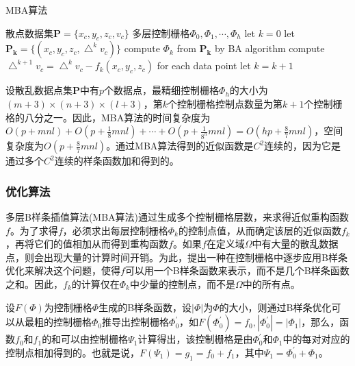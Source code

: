 \begin{algorithm}
    \caption{MBA算法}
    \begin{algorithmic}[1] %
        \Require 散点数据集$ \mathbf{P} = \{ x_{c}, y_{c}, z_{c}, v_{c} \} $
        \Ensure 多层控制栅格$ \Phi_{0},\Phi_{1},\cdots,\Phi_{h} $
        \State let $ k = 0 $
        \State let $ \mathbf{P_{k}} = \{ \left( x_{c}, y_{c}, z_{c}, \bigtriangleup^{k}v_{c} \right) \} $
        \State compute $ \Phi_{k} $ from $ \mathbf{P_{k}} $ by BA algorithm
        \State compute $ \bigtriangleup^{k+1}v_{c} = \bigtriangleup^{k}v_{c} - f_{k}\left( x_{c}, y_{c}, z_{c} \right) $ for each data point
        \State let $ k = k+1 $
        \EndWhile
    \end{algorithmic}
\end{algorithm}

设散乱数据点集$ \mathbf{P} $中有$ p $个数据点，最精细控制栅格$ \Phi_{h} $的大小为$ \left( m+3 \right) \times \left( n+3 \right) \times \left( l+3 \right) $，第$ k $个控制栅格控制点数量为第$ k+1 $个控制栅格的八分之一。因此，MBA算法的时间复杂度为$ O\left( p+mnl \right) + O\left( p+\frac{1}{8}mnl \right)+ \cdots+O\left( p+\frac{1}{8^{h}}mnl \right) = O\left( hp+\frac{8}{7}mnl \right) $，空间复杂度为$ O\left( p+\frac{8}{7}mnl \right) $。通过MBA算法得到的近似函数是$ C^{2} $连续的，因为它是通过多个$ C^{2} $连续的样条函数加和得到的。

\subsubsection{优化算法}
多层B样条插值算法(MBA算法)通过生成多个控制栅格层数，来求得近似重构函数$ f $。为了求得$ f $，必须求出每层控制栅格$ \Phi_{k} $的控制点值，从而确定该层的近似函数$ f_{k} $，再将它们的值相加从而得到重构函数$ f $。如果$ f $在定义域$ \Omega $中有大量的散乱数据点，则会出现大量的计算时间开销。为此，提出一种在控制栅格中逐步应用B样条优化来解决这个问题，使得$ f $可以用一个B样条函数来表示，而不是几个B样条函数之和。因此，$ f_{k} $的计算仅在$ \Phi_{k} $中少量的控制点，而不是$ \Omega $中的所有点。

设$ F\left( \Phi \right) $为控制栅格$ \Phi $生成的B样条函数，设$ | \Phi | $为$ \Phi $的大小，则通过B样条优化可以从最粗的控制栅格$ \Phi_{0} $推导出控制栅格$ \Phi_{0}^{'} $，如$ F\left( \Phi_{0}^{'} \right) = f_{0} , | \Phi_{0}^{'} | = | \Phi_{1} | $，那么，函数$ f_{0} $和$ f_{1} $的和可以由控制栅格$ \Psi_{1} $计算得出，该控制栅格是由$ \Phi_{0}^{'} $和$ \Phi_{1} $中的每对对应的控制点相加得到的。也就是说，$ F\left( \Psi_{1} \right) = g_{1} = f_{0} + f_{1} $，其中$ \Psi_{1} = \Phi_{0}^{'} + \Phi_{1} $。

